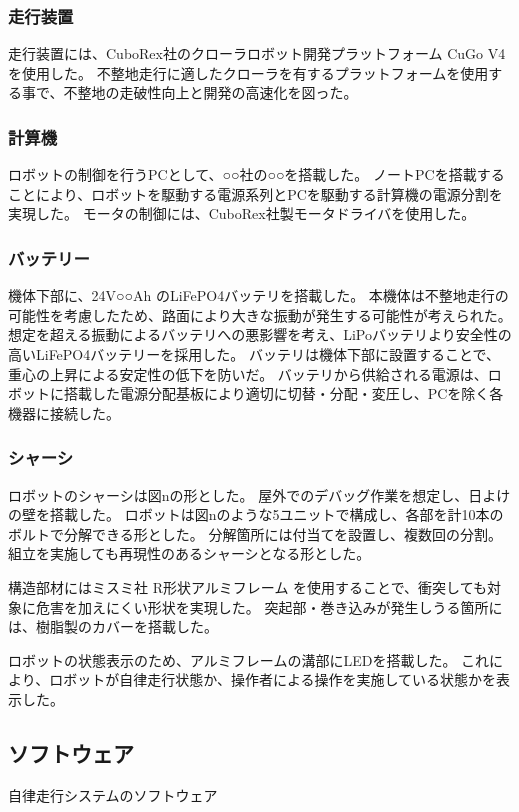 \subsubsection{走行装置}
走行装置には、CuboRex社のクローラロボット開発プラットフォーム CuGo V4を使用した。
不整地走行に適したクローラを有するプラットフォームを使用する事で、不整地の走破性向上と開発の高速化を図った。

\subsubsection{計算機}
ロボットの制御を行うPCとして、○○社の○○を搭載した。
ノートPCを搭載することにより、ロボットを駆動する電源系列とPCを駆動する計算機の電源分割を実現した。
モータの制御には、CuboRex社製モータドライバを使用した。

\subsubsection{バッテリー}
機体下部に、24V○○Ah のLiFePO4バッテリを搭載した。
本機体は不整地走行の可能性を考慮したため、路面により大きな振動が発生する可能性が考えられた。
想定を超える振動によるバッテリへの悪影響を考え、LiPoバッテリより安全性の高いLiFePO4バッテリーを採用した。
バッテリは機体下部に設置することで、重心の上昇による安定性の低下を防いだ。
バッテリから供給される電源は、ロボットに搭載した電源分配基板により適切に切替・分配・変圧し、PCを除く各機器に接続した。

\subsubsection{シャーシ}
ロボットのシャーシは図nの形とした。
屋外でのデバッグ作業を想定し、日よけの壁を搭載した。
ロボットは図nのような5ユニットで構成し、各部を計10本のボルトで分解できる形とした。
分解箇所には付当てを設置し、複数回の分割。組立を実施しても再現性のあるシャーシとなる形とした。

構造部材にはミスミ社 R形状アルミフレーム を使用することで、衝突しても対象に危害を加えにくい形状を実現した。
突起部・巻き込みが発生しうる箇所には、樹脂製のカバーを搭載した。

ロボットの状態表示のため、アルミフレームの溝部にLEDを搭載した。
これにより、ロボットが自律走行状態か、操作者による操作を実施している状態かを表示した。

\subsection{ソフトウェア}
自律走行システムのソフトウェア

